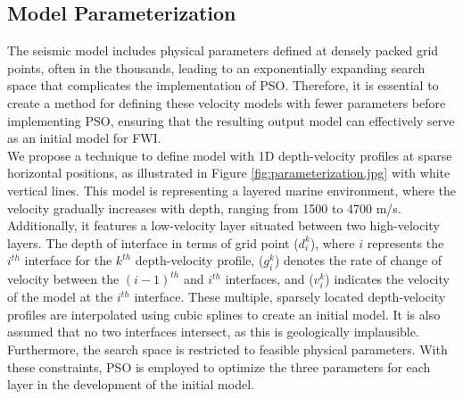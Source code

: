 \documentclass[paper,revised]{geophysics}
\begin{document}

\subsection{Model Parameterization}
The seismic model includes physical parameters defined at densely packed grid points, often in the thousands, leading to an exponentially expanding search space that complicates the implementation of PSO. Therefore, it is essential to create a method for defining these velocity models with fewer parameters before implementing PSO, ensuring that the resulting output model can effectively serve as an initial model for FWI. 
\\
We propose a technique to define model with 1D depth-velocity profiles at sparse horizontal positions, as illustrated in Figure \ref{fig:parameterization.jpg} with white vertical lines. This model is representing a layered marine environment, where the velocity gradually increases with depth, ranging from 1500 to 4700 m/s. Additionally, it features a low-velocity layer situated between two high-velocity layers. The depth of interface in terms of grid point (\(d_i^k\)), where \(i\) represents the \(i^{th}\) interface for the \(k^{th}\) depth-velocity profile, (\(g_i^k\)) denotes the rate of change of velocity between the \((i - 1)^{th}\) and \(i^{th}\) interfaces, and (\(v_i^k\)) indicates the velocity of the model at the \(i^{th}\) interface.  These multiple, sparsely located depth-velocity profiles are interpolated using cubic splines to create an initial model. It is also assumed that no two interfaces intersect, as this is geologically implausible. Furthermore, the search space is restricted to feasible physical parameters. With these constraints, PSO is employed to optimize the three parameters for each layer in the development of the initial model.

\end{document}
